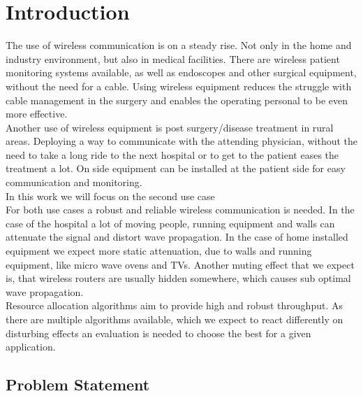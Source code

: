 \chapter{Introduction}
\label{chap:introduction}
The use of wireless communication is on a steady rise. Not only in the home and industry environment,
but also in medical facilities. There are wireless patient monitoring systems available, as well as 
endoscopes and other surgical equipment, without the need for a cable.
Using wireless equipment reduces the struggle with cable management in the surgery and enables the operating
personal to be even more effective.\\
Another use of wireless equipment is post surgery/disease treatment in rural areas. Deploying a way to communicate
with the attending physician, without the need to take a long ride to the next hospital or to get to the patient
eases the treatment a lot. On side equipment can be installed at the patient side for easy communication and monitoring.\\
In this work we will focus on the second use case\\
For both use cases a robust and reliable wireless communication is needed.
In the case of the hospital a lot of moving people, running equipment and walls can attenuate the signal and distort wave
propagation. In the case of home installed equipment we expect more static attenuation, due to walls and running equipment, like micro wave ovens
and TVs. Another muting effect that we expect is, that wireless routers are usually hidden somewhere, which causes sub optimal wave propagation.\\

Resource allocation algorithms aim to provide high and robust throughput. As there are multiple algorithms available, which we expect to react differently on
disturbing effects an evaluation is needed to choose the best for a given application.

\section{Problem Statement}
\label{sec:intro:probstatement}

